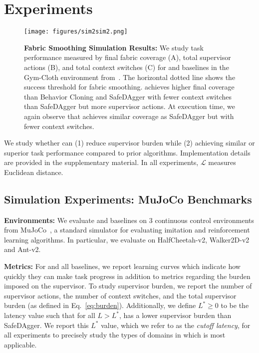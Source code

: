 \section{Experiments}
\label{sec:results}
\begin{figure*}[htb!]
\center
\texttt{[image: figures/sim2sim2.png]}
\caption{
\textbf{Fabric Smoothing Simulation Results:} We study task performance measured by final fabric coverage (A), total supervisor actions (B), and total context switches (C) for \algname and baselines in the Gym-Cloth environment from~\cite{seita_fabrics_2020}. The horizontal dotted line shows the success threshold for fabric smoothing. \algname achieves higher final coverage than Behavior Cloning and SafeDAgger with fewer context switches than SafeDAgger but more supervisor actions. At execution time, we again observe that \algname achieves similar coverage as SafeDAgger but with fewer context switches.}
\label{fig:sim2sim}
\end{figure*}
We study whether \algname can (1) reduce supervisor burden while (2) achieving similar or superior task performance compared to prior algorithms. Implementation details are provided in the supplementary material. In all experiments, $\mathcal{L}$ measures Euclidean distance.  %

\subsection{Simulation Experiments: MuJoCo Benchmarks}\label{ssec:mujoco-results}
\textbf{Environments: }We evaluate \algname and baselines on 3 continuous control environments from MuJoCo~\cite{mujoco}, a standard simulator for evaluating imitation and reinforcement learning algorithms. In particular, we evaluate on HalfCheetah-v2, Walker2D-v2 and Ant-v2.

\textbf{Metrics:}
\label{ssec:metrics}
For \algname and all baselines, we report learning curves which indicate how quickly they can make task progress in addition to metrics regarding the burden imposed on the supervisor. To study supervisor burden, we report the number of supervisor actions, the number of context switches, and the total supervisor burden (as defined in Eq.~\eqref{eq:burden}). Additionally, we define $L^* \geq 0$ to be the latency value such that for all $L > L^*$, \algname has a lower supervisor burden than SafeDAgger. We report this $L^*$ value, which we refer to as the \textit{cutoff latency}, for all experiments to precisely study the types of domains in which \algname is most applicable.

